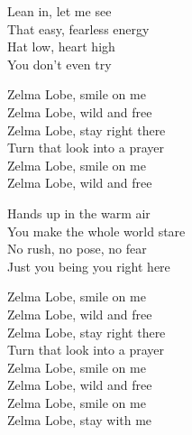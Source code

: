 \begin{lyrics}
Lean in, let me see\\
That easy, fearless energy\\
Hat low, heart high\\
You don’t even try

Zelma Lobe, smile on me\\
Zelma Lobe, wild and free\\
Zelma Lobe, stay right there\\
Turn that look into a prayer\\
Zelma Lobe, smile on me\\
Zelma Lobe, wild and free

Hands up in the warm air\\
You make the whole world stare\\
No rush, no pose, no fear\\
Just you being you right here

Zelma Lobe, smile on me\\
Zelma Lobe, wild and free\\
Zelma Lobe, stay right there\\
Turn that look into a prayer\\
Zelma Lobe, smile on me\\
Zelma Lobe, wild and free\\
Zelma Lobe, smile on me\\
Zelma Lobe, stay with me
\end{lyrics}

